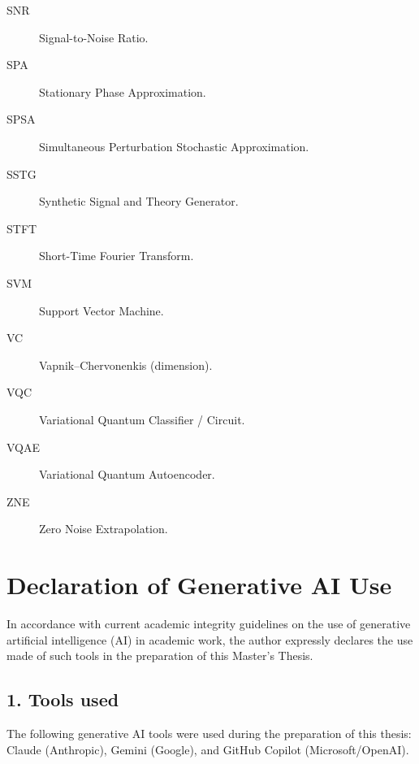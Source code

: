 \documentclass[11pt,a4paper, english]{book}
\theoremstyle{plain}
\theoremstyle{definition}
\numberwithin{equation}{chapter}
\numberwithin{figure}{chapter}
\numberwithin{table}{chapter}
\begin{document}
\begin{description}
  \item[SNR]   Signal-to-Noise Ratio.
  \item[SPA]   Stationary Phase Approximation.
  \item[SPSA]  Simultaneous Perturbation Stochastic Approximation.
  \item[SSTG]  Synthetic Signal and Theory Generator.
  \item[STFT]  Short-Time Fourier Transform.
  \item[SVM]   Support Vector Machine.
  \item[VC]    Vapnik--Chervonenkis (dimension).
  \item[VQC]   Variational Quantum Classifier / Circuit.
  \item[VQAE]  Variational Quantum Autoencoder.
  \item[ZNE]   Zero Noise Extrapolation.
\end{description}


\chapter{Declaration of Generative AI Use}
\label{app:ia-declaration}

In accordance with current academic integrity guidelines on the use of
generative artificial intelligence (AI) in academic work, the author
expressly declares the use made of such tools in the preparation of
this Master's Thesis.

\section*{1. Tools used}
The following generative AI tools were used during the preparation of
this thesis: Claude (Anthropic), Gemini (Google), and GitHub Copilot
(Microsoft/OpenAI).
\end{document}
